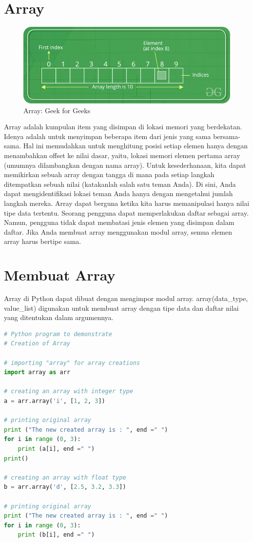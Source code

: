 \section{Array}

\begin{figure}[H]
        \centerline{\includegraphics[scale=0.5]{figures/array/array-1}}
        \caption{Array: Geek for Geeks}
\end{figure}

Array adalah kumpulan item yang disimpan di lokasi memori yang berdekatan. Idenya adalah untuk menyimpan beberapa item dari jenis yang sama bersama-sama. Hal ini memudahkan untuk menghitung posisi setiap elemen hanya dengan menambahkan offset ke nilai dasar, yaitu, lokasi memori elemen pertama array (umumnya dilambangkan dengan nama array). Untuk kesederhanaan, kita dapat memikirkan sebuah array dengan tangga di mana pada setiap langkah ditempatkan sebuah nilai (katakanlah salah satu teman Anda). Di sini, Anda dapat mengidentifikasi lokasi teman Anda hanya dengan mengetahui jumlah langkah mereka. Array dapat berguna ketika kita harus memanipulasi hanya nilai tipe data tertentu. Seorang pengguna dapat memperlakukan daftar sebagai array. Namun, pengguna tidak dapat membatasi jenis elemen yang disimpan dalam daftar. Jika Anda membuat array menggunakan modul array, semua elemen array harus bertipe sama.

\section{Membuat Array}

Array di Python dapat dibuat dengan mengimpor modul array. array(data\_type, value\_list) digunakan untuk membuat array dengan tipe data dan daftar nilai yang ditentukan dalam argumennya.

\begin{lstlisting}[language=python, caption=Membuat Array]
# Python program to demonstrate
# Creation of Array
 
# importing "array" for array creations
import array as arr
 
# creating an array with integer type
a = arr.array('i', [1, 2, 3])
 
# printing original array
print ("The new created array is : ", end =" ")
for i in range (0, 3):
    print (a[i], end =" ")
print()
 
# creating an array with float type
b = arr.array('d', [2.5, 3.2, 3.3])
 
# printing original array
print ("The new created array is : ", end =" ")
for i in range (0, 3):
    print (b[i], end =" ")
\end{lstlisting}

